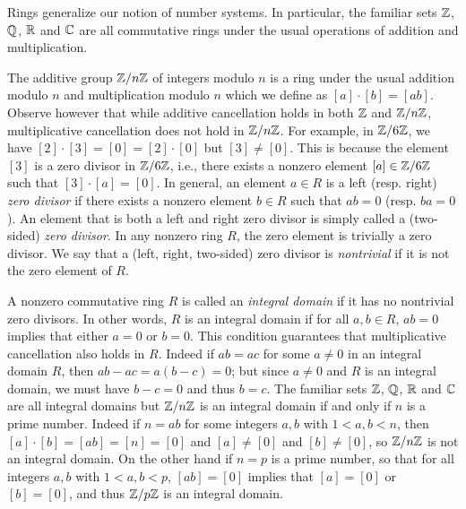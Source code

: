 \begin{example}
    \label{ex:integral-domains}
    Rings generalize our notion of number systems. In particular, the familiar
    sets \(\mathbb{Z}\), \(\mathbb{Q}\), \(\mathbb{R}\) and \(\mathbb{C}\) are all commutative rings under the
    usual operations of addition and multiplication. 

    The additive group \(\mathbb{Z}/n\mathbb{Z}\) of integers modulo \(n\) is a ring under the
    usual addition modulo \(n\) and multiplication modulo \(n\) which we define
    as \([a] \cdot [b] = [ab]\). Observe however that while additive
    cancellation holds in both \(\mathbb{Z}\) and \(\mathbb{Z}/n\mathbb{Z}\), multiplicative
    cancellation does not hold in \(\mathbb{Z}/n\mathbb{Z}\). For example, in \(\mathbb{Z}/6\mathbb{Z}\), we
    have \([2] \cdot [3] = [0] = [2] \cdot [0]\) but \([3] \neq [0]\). This is
    because the element \([3]\) is a zero divisor in \(\mathbb{Z}/6\mathbb{Z}\), i.e., there
    exists a nonzero element \([a] \in \mathbb{Z}/6\mathbb{Z}\) such that \([3] \cdot [a] =
    [0]\). In general, an element \(a \in R\) is a left (resp. right) \emph{zero
    divisor} if there exists a nonzero element \(b \in R\) such that \(ab = 0\)
    (resp. \(ba = 0\)). An element that is both a left and right zero divisor is
    simply called a (two-sided) \emph{zero divisor}. In any nonzero ring \(R\),
    the zero element is trivially a zero divisor. We say that a (left, right,
    two-sided) zero divisor is \emph{nontrivial} if it is not the zero element
    of \(R\).

    A nonzero commutative ring \(R\) is called an \emph{integral domain} if it
    has no nontrivial zero divisors. In other words, \(R\) is an integral domain
    if for all \(a, b \in R\), \(ab = 0\) implies that either \(a = 0\) or \(b =
    0\). This condition guarantees that multiplicative cancellation also holds
    in \(R\). Indeed if \(ab = ac\) for some \(a \neq 0\) in an integral domain
    \(R\), then \(ab - ac = a(b - c) = 0\); but since \(a \neq 0\) and \(R\) is
    an integral domain, we must have \(b - c = 0\) and thus \(b = c\). The
    familiar sets \(\mathbb{Z}\), \(\mathbb{Q}\), \(\mathbb{R}\) and \(\mathbb{C}\) are all integral domains but
    \(\mathbb{Z}/n\mathbb{Z}\) is an integral domain if and only if \(n\) is a prime number.
    Indeed if \(n = ab\) for some integers \(a, b\) with \(1 < a, b < n\), then
    \([a] \cdot [b] = [ab] = [n] = [0]\) and \([a] \neq [0]\) and \([b] \neq
    [0]\), so \(\mathbb{Z}/n\mathbb{Z}\) is not an integral domain. On the other hand if \(n =
    p\) is a prime number, so that for all integers \(a, b\) with \(1 < a, b <
    p\), \([ab] = [0]\) implies that \([a] = [0]\) or \([b] = [0]\), and thus
    \(\mathbb{Z}/p\mathbb{Z}\) is an integral domain.


\end{example}
